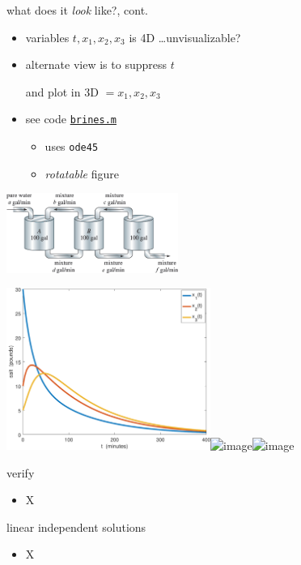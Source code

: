 \documentclass[urlcolor=blue,dvipsnames]{beamer}
\begin{document}
\begin{frame}{what does it \emph{look} like?, cont.}

\begin{itemize}
\item variables $t,x_1,x_2,x_3$ is 4D \dots unvisualizable?
\item alternate view is to suppress $t$

and plot in 3D $=x_1,x_2,x_3$
\item see code \href{https://bueler.github.io/math302/assets/codes/brines.m}{\texttt{brines.m}}
    \begin{itemize}
    \item<2> uses \texttt{ode45}
    \item<2> \emph{rotatable} figure
    \end{itemize}
\end{itemize}

\vspace{-21mm}
\hfill \includegraphics[width=0.42\textwidth]{figs/three-tanks}

\mbox{\includegraphics[width=0.5\textwidth]{figs/brines-xvt}\quad \includegraphics<1>[width=0.5\textwidth]{figs/brines-3d}\includegraphics<2>[width=0.5\textwidth]{figs/brines-3d-again}}
\end{frame}


\begin{frame}{verify}

\begin{itemize}
\item X
\end{itemize}
\end{frame}


\begin{frame}{linear independent solutions}

\begin{itemize}
\item X
\end{itemize}
\end{frame}
\end{document}
